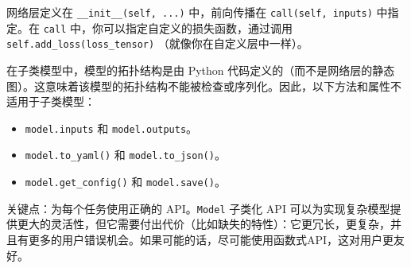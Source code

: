 网络层定义在 \texttt{\_\_init\_\_(self,\ ...)} 中，前向传播在
\texttt{call(self,\ inputs)} 中指定。在 \texttt{call}
中，你可以指定自定义的损失函数，通过调用
\texttt{self.add\_loss(loss\_tensor)} （就像你在自定义层中一样）。

在子类模型中，模型的拓扑结构是由 Python
代码定义的（而不是网络层的静态图）。这意味着该模型的拓扑结构不能被检查或序列化。因此，以下方法和属性不适用于子类模型：

\begin{itemize}
\tightlist
\item
  \texttt{model.inputs} 和 \texttt{model.outputs}。
\item
  \texttt{model.to\_yaml()} 和 \texttt{model.to\_json()}。
\item
  \texttt{model.get\_config()} 和 \texttt{model.save()}。
\end{itemize}

关键点：为每个任务使用正确的 API。\texttt{Model} 子类化 API 可以为实现复杂模型提供更大的灵活性，但它需要付出代价（比如缺失的特性）：它更冗长，更复杂，并且有更多的用户错误机会。如果可能的话，尽可能使用函数式API，这对用户更友好。
